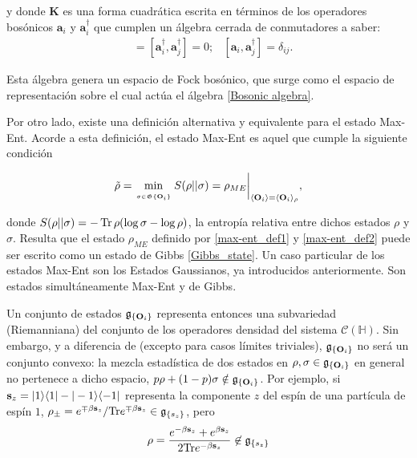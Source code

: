 \documentclass{report} %
\newcommand{\lgg}{\langle}
\newcommand{\rgg}{\rangle}
\numberwithin{equation}{section}
\begin{document}
\begin{Omitir}
y donde $\mathbf{K}$ es una forma cuadrática escrita en términos de los operadores bosónicos $\mathbf{a}_i$ y $\mathbf{a}_i^{\dagger}$ que cumplen un álgebra cerrada de conmutadores a saber:
\begin{align}
    [\mathbf{a}_i,\mathbf{a}_j] & = [\mathbf{a}_i^{\dagger},\mathbf{a}_j^{\dagger}] =0;  &  [\mathbf{a}_i, \mathbf{a}_j^{\dagger}] = \delta_{ij}.
    \label{Bosonic algebra}
\end{align}

Esta álgebra genera un espacio de Fock bosónico, que surge como el espacio de representación sobre el cual actúa el álgebra \eqref{Bosonic algebra}. 

Por otro lado, existe una definición alternativa y equivalente para el estado Max-Ent. Acorde a esta definición, el estado Max-Ent es aquel que cumple la siguiente condición 

\begin{equation}
\tilde{\rho} = \min_{\atop{\sigma \in \mathfrak{G}\{{\bf O}_i\}}} S(\rho || \sigma) = \rho_{ME} \bigg|_{\lgg {\bf O}_i\rgg = \lgg {\bf O}_i\rgg_{\rho}},   
\label{max-ent_def2}
\end{equation}

donde $S(\rho||\sigma) = - \Tr \rho (\log \sigma - \log \rho)$, la entropía relativa entre dichos estados $\rho$ y $\sigma$. Resulta que el estado $\rho_{ME}$ definido por \eqref{max-ent_def1} y \eqref{max-ent_def2} puede ser escrito como un estado de Gibbs \eqref{Gibbs_state}. Un caso particular de los estados Max-Ent son los Estados Gaussianos, ya introducidos anteriormente. 
Son estados simultáneamente Max-Ent y de Gibbs. \\
\end{Omitir}


Un conjunto de estados $\mathfrak{g}_{\{{\bf O}_i\}}$ representa entonces una subvariedad (Riemanniana) del conjunto de los operadores densidad del sistema $\mathcal{C}(\mathds{H})$. Sin embargo, y a diferencia de 
(excepto para casos límites triviales), $\mathfrak{g}_{\{{\bf O}_i\}}$ no será un conjunto convexo: la mezcla estadística de dos estados en $\rho, \sigma \in \mathfrak{g}_{\{{\bf O}_i\}}$ en general no pertenece a dicho espacio, $p \rho + (1-p) \sigma \notin\mathfrak{g}_{\{{\bf O}_i\}}$. Por ejemplo, si ${\bf s}_z=|1\rangle\langle 1|-|-1\rangle\langle -1|$ representa la componente $z$ del espín de una partícula de espín $1$,
$\rho_{\pm}=e^{\mp \beta{\bf s}_z}/{\Tr}e^{\mp \beta{\bf s}_z} \in  \mathfrak{g}_{\{s_z\}}$,  pero
$$
\rho=\frac{e^{- \beta{\bf s}_z}+e^{\beta{\mathbf s}_z}}{2 \mathrm{Tr}e^{- \beta{\mathbf s}_z}} \not\in 
\mathfrak{g}_{\{s_z\}}
$$
\end{document}
